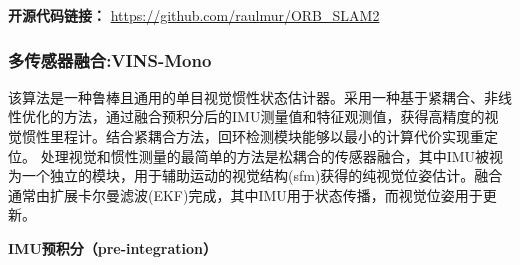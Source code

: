 \documentclass[cs4size,a4paper]{ctexart}
\numberwithin{equation}{section}
\numberwithin{table}{section}
\numberwithin{figure}{section}
\begin{document}
\textbf{开源代码链接：}
\url{https://github.com/raulmur/ORB_SLAM2}

\subsubsection{多传感器融合:VINS-Mono}
该算法\cite{8421746}是一种鲁棒且通用的单目视觉惯性状态估计器。采用一种基于紧耦合、非线性优化的方法，通过融合预积分后的IMU测量值和特征观测值，获得高精度的视觉惯性里程计。结合紧耦合方法，回环检测模块能够以最小的计算代价实现重定位。
处理视觉和惯性测量的最简单的方法是松耦合的传感器融合\cite{8576618,8630025}，其中IMU被视为一个独立的模块，用于辅助运动的视觉结构(sfm)获得的纯视觉位姿估计。融合通常由扩展卡尔曼滤波(EKF)完成，其中IMU用于状态传播，而视觉位姿用于更新。
  
\textbf{IMU预积分（pre-integration）}
\end{document}
